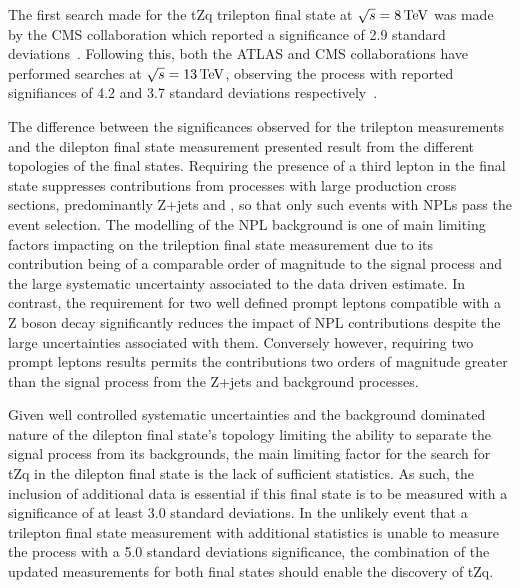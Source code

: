 The first search made for the tZq trilepton final state at $\sqrt{s} = 8 \,\text{Te\hspace{-.08em}V}$ was made by the CMS collaboration which reported a significance of 2.9 standard deviations~\cite{Sirunyan:2017kkr}.
Following this, both the ATLAS and CMS collaborations have performed searches at $\sqrt{s} = 13 \,\text{Te\hspace{-.08em}V}$, observing the process with reported signifiances of 4.2 and 3.7 standard deviations respectively~\cite{Aaboud:2017ylb,Sirunyan:2017nbr}.

The difference between the significances observed for the trilepton measurements and the dilepton final state measurement presented result from the different topologies of the final states.
Requiring the presence of a third lepton in the final state suppresses contributions from processes with large production cross sections, predominantly Z+jets and \ttbar, so that only such events with NPLs pass the event selection.
The modelling of the NPL background is one of main limiting factors impacting on the trileption final state measurement due to its contribution being of a comparable order of magnitude to the signal process and the large systematic uncertainty associated to the data driven estimate.
In contrast, the requirement for two well defined prompt leptons compatible with a Z boson decay significantly reduces the impact of NPL contributions despite the large uncertainties associated with them.
Conversely however, requiring two prompt leptons results permits the contributions two orders of magnitude greater than the signal process from the Z+jets and \ttbar background processes.

Given well controlled systematic uncertainties and the background dominated nature of the dilepton final state's topology limiting the ability to separate the signal process from its backgrounds, the main limiting factor for the search for tZq in the dilepton final state is the lack of sufficient statistics.
As such, the inclusion of additional data is essential if this final state is to be measured with a significance of at least 3.0 standard deviations.
In the unlikely event that a trilepton final state measurement with additional statistics is unable to measure the process with a 5.0 standard deviations significance, the combination of the updated measurements for both final states should enable the discovery of tZq.